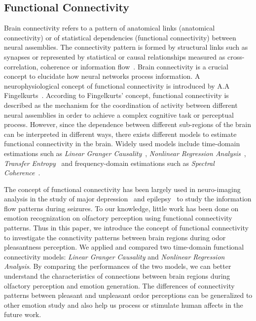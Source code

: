 \subsection{Functional Connectivity}
Brain connectivity refers to a pattern of anatomical links (anatomical connectivity) or of statistical dependencies (functional connectivity) between neural assemblies. The connectivity pattern is formed by structural links such as synapses or represented by statistical or causal relationships measured as cross-correlation, coherence or information flow~\cite{sporns2007brain}. Brain connectivity is a crucial concept to elucidate how neural networks process information. A neurophysiological concept of functional connectivity is introduced by A.A Fingelkurts~\cite{fingelkurts2005functional}. According to Fingelkurts' concept, functional connectivity is described as the mechanism for the coordination of activity between different neural assemblies in order to achieve a complex cognitive task or perceptual process. However, since the dependence between different sub-regions of the brain can be interpreted in different ways, there exists different models to estimate functional connectivity in the brain. Widely used models include time-domain estimations such as \emph{Linear Granger Causality}~\cite{granger1969investigating}, \emph{Nonlinear Regression Analysis}~\cite{pijn1990localization}, \emph{Transfer Entropy}~\cite{schreiber2000measuring} and frequency-domain estimations such as \emph{Spectral Coherence}~\cite{sun2004measuring}.

The concept of functional connectivity has been largely used in neuro-imaging analysis in the study of major depression~\cite{greicius2007resting} and epilepsy~\cite{waites2006functional} to study the information flow patterns during seizures. To our knowledge, little work has been done on emotion recognization on olfactory perception using functional connectivity patterns. Thus in this paper, we introduce the concept of functional connectivity to investigate the connctivity patterns between brain regions during odor pleasantness perception. We applied and compared two time-domain functional connectivity models: \emph{Linear Granger Causality} and \emph{Nonlinear Regression Analysis}. By comparing the performances of the two models, we can better understand the characteristics of connections between brain regions during olfactory perception and emotion generation. The differences of connectivity patterns between pleasant and unpleasant ordor perceptions can be generalized to other emotion study and also help us process or stimulate human affects in the future work. 

